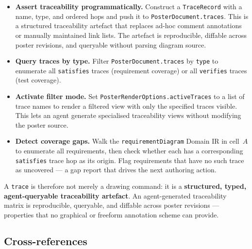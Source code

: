 \begin{itemize}
  \item \textbf{Assert traceability programmatically.}  Construct a
    \texttt{TraceRecord} with a name, type, and ordered hops and push it to
    \texttt{PosterDocument.traces}.  This is a structured traceability
    artefact that replaces ad-hoc comment annotations or manually maintained
    link lists.  The artefact is reproducible, diffable across poster
    revisions, and queryable without parsing diagram source.

  \item \textbf{Query traces by type.}  Filter
    \texttt{PosterDocument.traces} by \texttt{type} to enumerate all
    \texttt{satisfies} traces (requirement coverage) or all \texttt{verifies}
    traces (test coverage).

  \item \textbf{Activate filter mode.}  Set
    \texttt{PosterRenderOptions.activeTraces} to a list of trace names to
    render a filtered view with only the specified traces visible.  This lets
    an agent generate specialised traceability views without modifying the
    poster source.

  \item \textbf{Detect coverage gaps.}  Walk the \texttt{requirementDiagram}
    Domain IR in cell~$A$ to enumerate all requirements, then check whether
    each has a corresponding \texttt{satisfies} trace hop as its origin.  Flag
    requirements that have no such trace as uncovered --- a gap report that
    drives the next authoring action.
\end{itemize}

A \texttt{trace} is therefore not merely a drawing command: it is a
\textbf{structured, typed, agent-queryable traceability artefact}.  An
agent-generated traceability matrix is reproducible, queryable, and diffable
across poster revisions --- properties that no graphical or freeform annotation
scheme can provide.

\subsection*{Cross-references}

